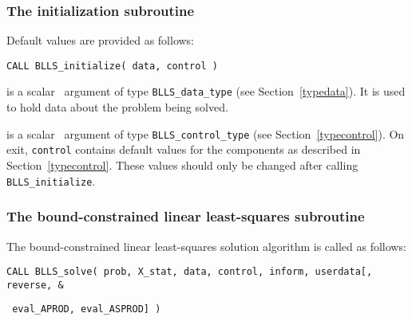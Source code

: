 \documentclass{galahad}
\newcommand{\packagename}{BLLS}
\begin{document}

\subsubsection{The initialization subroutine}\label{subinit}
 Default values are provided as follows:
\vspace*{1mm}

\hspace{8mm}
{\tt CALL \packagename\_initialize( data, control )}

\vspace*{-3mm}
\begin{description}

 is a scalar \intentinout\ argument of type
{\tt \packagename\_data\_type}
(see Section~\ref{typedata}). It is used to hold data about the problem being
solved.

 is a scalar \intentout\ argument of type
{\tt \packagename\_control\_type}
(see Section~\ref{typecontrol}).
On exit, {\tt control} contains default values for the components as
described in Section~\ref{typecontrol}.
These values should only be changed after calling
{\tt \packagename\_initialize}.

\end{description}


\subsubsection{The bound-constrained linear least-squares subroutine}\label{qps}
The bound-constrained linear least-squares solution algorithm is called
as follows:
\vspace*{1mm}

\hspace{8mm}
{\tt CALL \packagename\_solve( prob, X\_stat, data, control, inform, userdata[,
reverse, %
\&}
\vspace*{-1mm}

\hspace{37mm}
{\tt
eval\_APROD, eval\_ASPROD] )}
\end{document}

